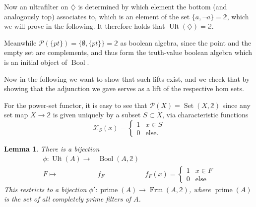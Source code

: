 \documentclass[12pt,a4paper]{article}
\newtheorem{lemma}{Lemma}[section] %
\DeclareMathOperator{\Set}{Set}
\DeclareMathOperator{\Frm}{Frm}
\DeclareMathOperator{\Bool}{Bool}
\DeclareMathOperator{\Ult}{Ult}
\DeclareMathOperator{\prim}{prime}
\begin{document}
Now  an ultrafilter on $\diamondsuit$ is determined by which element the bottom (and analogously top) associates to, which is an element of the set $\{a, \neg a\}= \mathbb{2}$, which we will prove in the following. It  therefore holds that  $\Ult(\diamondsuit) = \mathbb{2}$.

Meanwhile $\mathcal{P}(\{pt\}) = \{\emptyset, \{pt\}\} = \mathbb{2}$ as boolean algebra, since the point and the empty set are complements, and thus form the truth-value boolean algebra which is an initial object of $\Bool$. 

 Now in the following we want to show that such lifts exist, and we check that by showing that the adjunction we gave serves as a lift of the respective hom sets. 
 
For the power-set functor, it is easy to see that $\mathcal{P}(X) = \Set(X, \mathbb{2}) $ since any set map  $X \to \mathbb{2}$ is given uniquely by a subset $ S \subset X$, via characteristic functions \begin{equation*}
  \mathcal{X}_{ S}(x) = \begin{cases}
   1 & x \in  S \\
    0 & \text{else}.
  \end{cases}
\end{equation*}




\begin{lemma}
	There is a bijection \begin{align*}
  	\phi: \Ult(A) \to& \Bool(A, \mathbb{2})\\
  	F \mapsto& f_F &f_F(x) = \begin{cases}
   1 & x \in F \\
    0 & \text{else}
  \end{cases}
  \end{align*}
  This restricts to a bijection $\phi': \prim(A) \to \Frm(A, \mathbb{2})$, where $\prim(A)$ is the set of all completely prime filters of $A$.
\end{lemma}
\end{document}
